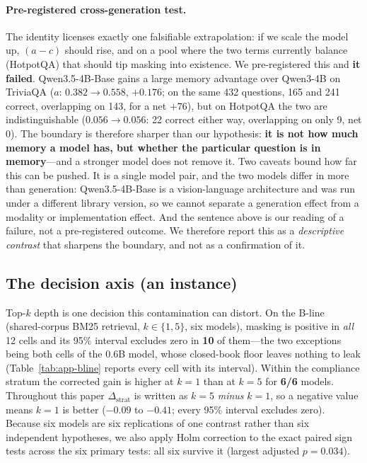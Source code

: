 \documentclass[11pt]{article}
\begin{document}
\paragraph{Pre-registered cross-generation test.} The identity licenses exactly one
falsifiable extrapolation: if we scale the model up, $(a-c)$ should rise, and on a pool
where the two terms currently balance (HotpotQA) that should tip masking into existence. We
pre-registered this and \textbf{it failed}. Qwen3.5-4B-Base gains a large memory advantage
over Qwen3-4B on TriviaQA ($a$: $0.382 \to 0.558$, $+0.176$; on the same 432 questions,
165 and 241 correct, overlapping on 143, for a net $+76$), but on HotpotQA the two are
indistinguishable ($0.056 \to 0.056$: 22 correct either way, overlapping on only 9, net
$0$). The boundary is therefore sharper than our hypothesis: \textbf{it
is not how much memory a model has, but whether the particular question is in
memory}---and a stronger model does not remove it. Two caveats bound how far this can be
pushed. It is a single model pair, and the two models differ in more than generation:
Qwen3.5-4B-Base is a vision-language architecture and was run under a different library
version, so we cannot separate a generation effect from a modality or implementation
effect. And the sentence above is our reading of a failure, not a pre-registered outcome.
We therefore report this as a \emph{descriptive contrast} that sharpens the boundary, and
not as a confirmation of it.

\subsection{The decision axis (an instance)}
\label{sec:decision}
Top-$k$ depth is one decision this contamination can distort. On the B-line (shared-corpus
BM25 retrieval, $k \in \{1,5\}$, six models), masking is positive in \emph{all} 12 cells and
its 95\% interval excludes zero in \textbf{10} of them---the two exceptions being both cells
of the 0.6B model, whose closed-book floor leaves nothing to leak (Table~\ref{tab:app-bline}
reports every cell with its interval). Within the compliance
stratum the corrected gain is higher at $k{=}1$ than at $k{=}5$ for \textbf{6/6} models.
Throughout this paper $\Delta_{\text{strat}}$ is written as $k{=}5$ \emph{minus} $k{=}1$, so
a negative value means $k{=}1$ is better ($-0.09$ to $-0.41$; every 95\% interval excludes
zero). Because six models are six replications of one contrast rather than six independent
hypotheses, we also apply Holm correction to the exact paired sign tests across the six
primary tests: all six survive it (largest adjusted $p = 0.034$).
\end{document}
